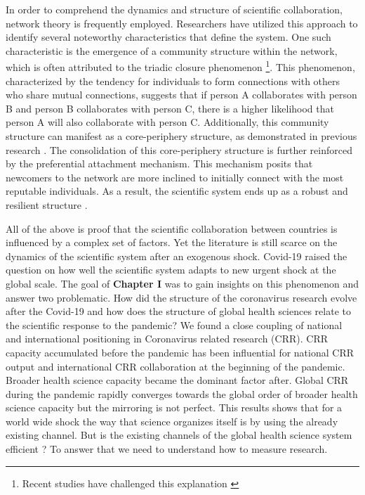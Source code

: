 In order to comprehend the dynamics and structure of scientific collaboration, network theory is frequently employed. Researchers have utilized this approach to identify several noteworthy characteristics that define the system. One such characteristic is the emergence of a community structure within the network, which is often attributed to the triadic closure phenomenon \footnote{Recent studies have challenged this explanation \cite{kim2017over}}. This phenomenon, characterized by the tendency for individuals to form connections with others who share mutual connections, suggests that if person A collaborates with person B and person B collaborates with person C, there is a higher likelihood that person A will also collaborate with person C. Additionally, this community structure can manifest as a core-periphery structure, as demonstrated in previous research \cite{wedell2022center}. The consolidation of this core-periphery structure is further reinforced by the preferential attachment mechanism. This mechanism posits that newcomers to the network are more inclined to initially connect with the most reputable individuals. As a result, the scientific system ends up as a robust and resilient structure \cite{wagner2017growth}.

All of the above is proof that the scientific collaboration between countries is influenced by a complex set of factors. Yet the literature is still scarce on the dynamics of the scientific system after an exogenous shock. Covid-19 raised the question on how well the scientific system adapts to new urgent shock at the global scale. The goal of \textbf{Chapter I} was to gain insights on this phenomenon and answer two problematic. How did the structure of the coronavirus research evolve after the Covid-19 and how does the structure of global health sciences relate to the scientific response to the pandemic? We found a close coupling of national and international positioning in Coronavirus related
research (CRR). CRR capacity accumulated before the pandemic has been influential for national CRR output and international CRR collaboration at the beginning of the pandemic. Broader health science capacity became the dominant factor after. Global CRR during the pandemic rapidly converges towards the global order of
broader health science capacity but the mirroring is not perfect. This results shows that for a world wide shock the way that science organizes itself is by using the already existing channel. But is the existing channels of the global health science system efficient ? To answer that we need to understand how to measure research.

